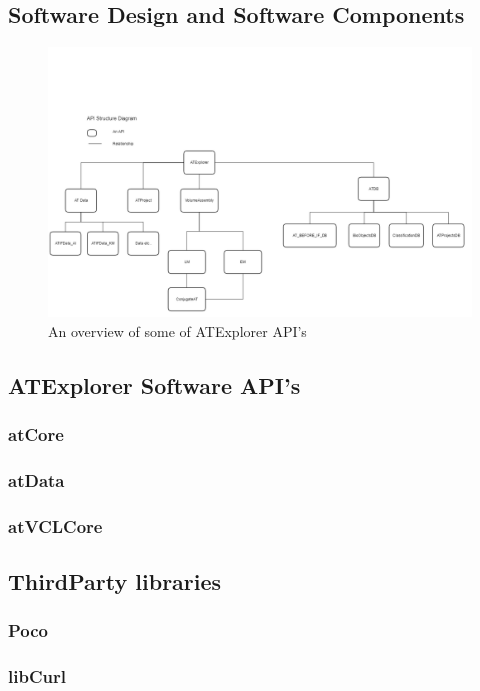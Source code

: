 \documentclass[11pt,fleqn]{book} %
\begin{document}
\begin{appendices}
\chapter{Software Design and Software Components}

\begin{figure}[h]
\centering\includegraphics[scale=0.35]{ATExplorer_APIs}
\caption{An overview of some of ATExplorer API's}
\end{figure}


\section{ATExplorer Software API's}
\subsection{atCore}
\subsection{atData}
\subsection{atVCLCore}

\section{ThirdParty libraries}
\subsection{Poco}
\subsection{libCurl}

\end{appendices}
\end{document}
